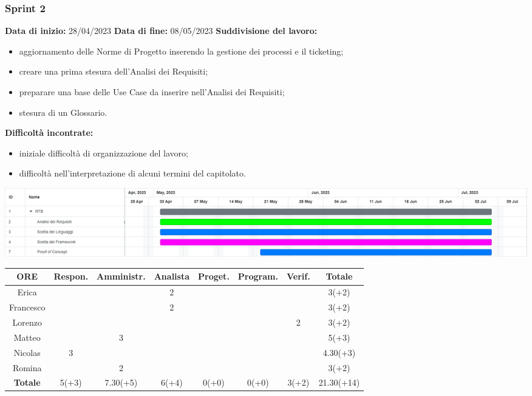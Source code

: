 \documentclass[a4paper, 12pt]{article}
\begin{document}
\subsubsection{Sprint 2}
\textbf{Data di inizio:} 28/04/2023\newline
\textbf{Data di fine:} 08/05/2023\newline
\newline
\textbf{Suddivisione del lavoro:}
\begin{itemize}
    \item aggiornamento delle Norme di Progetto inserendo la gestione dei processi e il ticketing;
    \item creare una prima stesura dell'Analisi dei Requisiti;
    \item preparare una base delle Use Case da inserire nell'Analisi dei Requisiti;
    \item stesura di un Glossario.
\end{itemize}
\textbf{Difficoltà incontrate:}
\begin{itemize}
    \item iniziale difficoltà di organizzazione del lavoro;
    \item difficoltà nell'interpretazione di alcuni termini  del capitolato.
\end{itemize}
\includegraphics[scale=0.24]{RTB_1.png}\newline
\newline
\begin{tabular}{|c|c|c|c|c|c|c|c|}
    \hline
    \textbf{ORE} & \textbf{Respon.} & \textbf{Amministr.} & \textbf{Analista} & \textbf{Proget.} & \textbf{Program.} & \textbf{Verif.} & \textbf{Totale}\\
    \hline
    Erica & & & 2 & & & & 3(+2)\\
    \hline
    Francesco & & & 2 & & & & 3(+2)\\
    \hline
    Lorenzo & & & & & & 2 & 3(+2)\\
    \hline
    Matteo & & 3 & & & & & 5(+3)\\
    \hline
    Nicolas & 3 & & & & & & 4.30(+3)\\
    \hline
    Romina & & 2 & & & & & 3(+2)\\
    \hline
    \textbf{Totale} & 5(+3) & 7.30(+5) & 6(+4) & 0(+0) & 0(+0) & 3(+2) & 21.30(+14)\\
    \hline
\end{tabular}\\[8pt]
\end{document}
